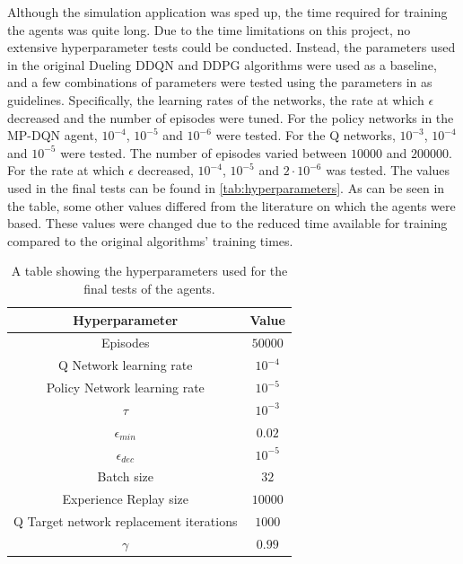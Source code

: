 \documentclass{kththesis}
\begin{document}
Although the simulation application was sped up, the time required for training the agents was quite long. Due to the time limitations on this project, no extensive hyperparameter tests could be conducted. Instead, the parameters used in the original Dueling DDQN and DDPG algorithms were used as a baseline, and a few combinations of parameters were tested using the parameters in \textcite{bester2019mpdqn} as guidelines. Specifically, the learning rates of the networks, the rate at which $\epsilon$ decreased and the number of episodes were tuned. For the policy networks in the MP-DQN agent, $10^{-4}$, $10^{-5}$ and $10^{-6}$ were tested. For the Q networks, $10^{-3}$, $10^{-4}$ and $10^{-5}$ were tested. The number of episodes varied between $10000$ and $200000$. For the rate at which $\epsilon$ decreased, $10^{-4}$, $10^{-5}$ and $2 \cdot 10^{-6}$ was tested. The values used in the final tests can be found in \autoref{tab:hyperparameters}. As can be seen in the table, some other values differed from the literature on which the agents were based. These values were changed due to the reduced time available for training compared to the original algorithms' training times.

\begin{table}
    \centering
    \begin{tabular}{|c|c|}
        \hline
        \textbf{Hyperparameter} & \textbf{Value} \\ \hline
        Episodes & $50000$ \\ \hline
        Q Network learning rate & $10^{-4}$ \\ \hline
        Policy Network learning rate & $10^{-5}$ \\ \hline
        $\tau$ & $10^{-3}$ \\ \hline
        $\epsilon_{min}$ & $0.02$ \\ \hline
        $\epsilon_{dec}$ & $10^{-5}$ \\ \hline
        Batch size & $32$ \\ \hline
        Experience Replay size & $10000$ \\ \hline
        Q Target network replacement iterations & $1000$ \\ \hline
        $\gamma$ & $0.99$ \\ \hline
    \end{tabular}
    \caption{A table showing the hyperparameters used for the final tests of the agents.}
    \label{tab:hyperparameters}
\end{table}
\end{document}
